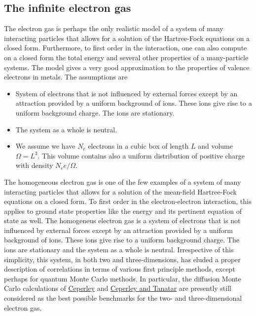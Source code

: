 \documentclass[%
oneside,                 %
final,                   %
10pt]{article}
\begin{document}
\noindent
\subsection*{The infinite electron gas}

The electron gas is perhaps the only realistic model of a 
system of many interacting particles that allows for a solution
of the Hartree-Fock equations on a closed form. Furthermore, to first order in the interaction, one can also
compute on a closed form the total energy and several other properties of a many-particle systems. 
The model gives a very good approximation to the properties of valence electrons in metals.
The assumptions are

\begin{itemize}
 \item System of electrons that is not influenced by external forces except by an attraction provided by a uniform background of ions. These ions give rise to a uniform background charge. The ions are stationary.

 \item The system as a whole is neutral.

 \item We assume we have $N_e$ electrons in a cubic box of length $L$ and volume $\Omega=L^3$. This volume contains also a uniform distribution of positive charge with density $N_ee/\Omega$. 
\end{itemize}

\noindent
The homogeneous electron gas is one of the few examples of a system of many
interacting particles that allows for a solution of the mean-field
Hartree-Fock equations on a closed form.  To first order in the
electron-electron interaction, this applies to ground state properties
like the energy and its pertinent equation of state as well.  The
homogeneus electron gas is a system of electrons that is not
influenced by external forces except by an attraction provided by a
uniform background of ions. These ions give rise to a uniform
background charge.  The ions are stationary and the system as a whole
is neutral.
Irrespective of this simplicity, this system, in both two and
three-dimensions, has eluded a proper description of correlations in
terms of various first principle methods, except perhaps for quantum
Monte Carlo methods. In particular, the diffusion Monte Carlo
calculations of \href{{http://journals.aps.org/prl/abstract/10.1103/PhysRevLett.45.566}}{Ceperley} 
and \href{{http://journals.aps.org/prb/abstract/10.1103/PhysRevB.39.5005}}{Ceperley and Tanatar} 
are presently still considered as the
best possible benchmarks for the two- and three-dimensional electron
gas. 
\end{document}
